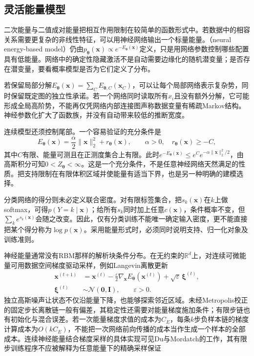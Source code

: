 \subsection{灵活能量模型}
\label{sec:pgm-energy-models-flexible}

二次能量与二值成对能量把相互作用限制在较简单的函数形式中。若数据中的相容关系需要更复杂的非线性特征，可以用神经网络输出一个标量能量。（neural energy-based model）仍由$p_{\bm{\theta}}(\bm{x})\propto e^{-E_{\bm{\theta}}(\bm{x})}$定义，只是用网络参数控制哪些配置具有低能量。网络中的确定性隐藏激活不是自动需要边缘化的随机潜变量；是否存在潜变量，要看概率模型是否为它们定义了分布。

若保留局部分解$E_{\bm{\theta}}(\bm{x})=\sum_CE_{\bm{\theta},C}(\bm{x}_C)$，可以让每个局部网络表示复杂势，同时保留既定图的独立性承诺。若一个网络同时读取所有$x_i$且没有额外分解，它可能形成全局高阶势，不能再仅凭网络内部连接图声称数据变量有稀疏Markov结构。神经参数化扩大了函数族，并没有自动带来较低的推断宽度。

连续模型还须控制尾部。一个容易验证的充分条件是
\[
  E_{\bm{\theta}}(\bm{x})
    =\frac{\alpha}{2}\lVert\bm{x}\rVert_2^2+r_{\bm{\theta}}(\bm{x}),
  \qquad \alpha>0,\quad r_{\bm{\theta}}(\bm{x})\geq-C,
\]
其中$C$有限、能量可测且在正测度集合上有限。此时$e^{-E_{\bm{\theta}}(\bm{x})}\leq e^Ce^{-\alpha\lVert\bm{x}\rVert_2^2/2}$，由高斯积分可知$0<Z_{\bm{\theta}}<\infty$。这是一个充分条件，不是任意神经网络天然满足的性质。把支持限制在有限体积区域并使能量有适当下界，也是另一种明确的建模选择。

分类网络的得分则未必定义联合密度。对有限标签集合，把$s_k(\bm{x})$在$k$上做softmax，可得$p(Y=k\mid\bm{x})$；给所有$s_k$同时加上任意$c(\bm{x})$，条件概率不变，但$\sum_ke^{s_k(\bm{x})}$会随之改变。因此，仅有分类训练不能唯一确定输入密度，更不能直接把某个得分称为$\log p(\bm{x})$。采用能量形式时，必须同时说明支持、归一化对象及训练准则。

神经能量通常没有RBM那样的解析块条件分布。在无约束的$\mathbb{R}^d$上，对连续可微能量可用数据空间梯度驱动采样，例如Langevin离散更新
\begin{equation}
  \begin{aligned}
    \bm{x}^{(t+1)}
      &=\bm{x}^{(t)}
        -\frac{\varepsilon}{2}
          \nabla_{\bm{x}}E_{\bm{\theta}}(\bm{x}^{(t)})
        +\sqrt{\varepsilon}\,\bm{\xi}^{(t)},\\
    \bm{\xi}^{(t)}&\sim\mathcal{N}(\bm{0},\bm{I}),
       \qquad \varepsilon>0.
  \end{aligned}
  \label{eq:pgm-energy-models-langevin}
\end{equation}
独立高斯噪声让状态不仅沿能量下降，也能够探索邻近区域。未经Metropolis校正的固定步长离散链一般有偏差，其稳定性还需要对能量梯度施加条件；有限步链也有初始化与混合误差。若一次能量梯度求值的成本为$C_E$，每条$k$步负样本链的梯度计算成本为$O(kC_E)$，不能把一次网络前向传播的成本当作生成一个样本的全部成本。连续神经能量结合梯度采样的具体实现可见Du与Mordatch的工作，其有限步训练程序不应被解释为任意能量下的精确采样保证

